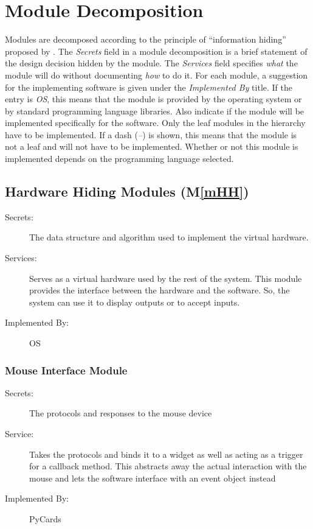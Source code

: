 \documentclass[12pt, titlepage]{article}
\newcommand{\mref}[1]{M\ref{#1}}
\begin{document}
	\section{Module Decomposition} \label{SecMD}
	Modules are decomposed according to the principle of ``information hiding''
	proposed by \citet{ParnasEtAl1984}. The \emph{Secrets} field in a module
	decomposition is a brief statement of the design decision hidden by the
	module. The \emph{Services} field specifies \emph{what} the module will do
	without documenting \emph{how} to do it. For each module, a suggestion for 
	the implementing software is given under the \emph{Implemented By} title. 
	If the entry is \emph{OS}, this means that the module is provided by the 
	operating system or by standard programming language libraries.  Also 
	indicate if the module will be implemented specifically for the software.
	Only the leaf modules in the hierarchy have to be implemented. If a dash 
	(\emph{--}) is shown, this means that the module is not a leaf and will not 
	have to be implemented. Whether or not this module is implemented depends 
	on the programming language selected.
	\subsection{Hardware Hiding Modules (\mref{mHH})}
	\begin{description}
		\item[Secrets:]The data structure and algorithm used to implement the 
		virtual hardware.
		\item[Services:]Serves as a virtual hardware used by the rest of the 
		system. This module provides the interface between the hardware and the 
		software. So, the system can use it to display outputs or to accept 
		inputs.
		\item[Implemented By:] OS
	\end{description}
	\subsubsection{Mouse Interface Module}
	\begin{description}
		\item[Secrets:]The protocols and responses to the mouse device
		\item[Service:]Takes the protocols and binds it to a widget as well as 
		acting as a trigger for a callback method. This abstracts away the 
		actual interaction with the mouse and lets the software interface with 
		an event object instead
		\item[Implemented By:] PyCards
	\end{description}
\end{document}
